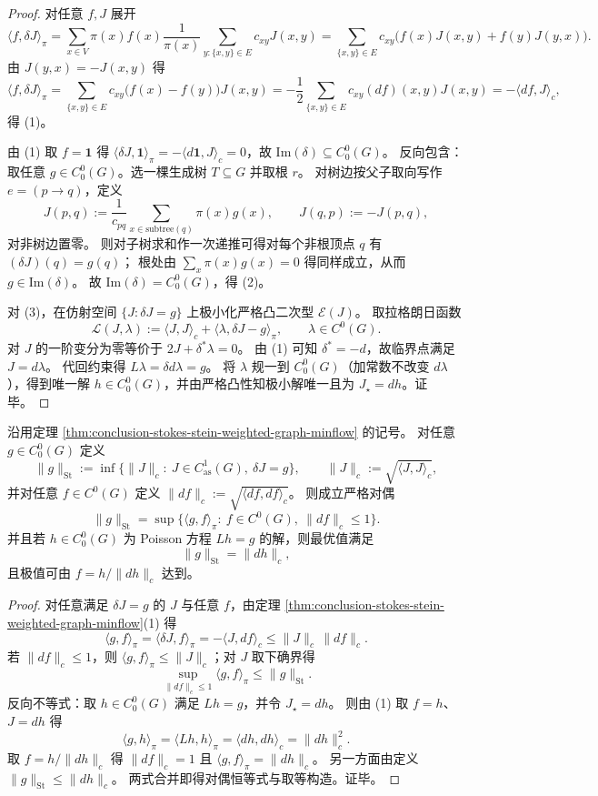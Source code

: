 \begin{proof}
对任意 \(f,J\) 展开
\[
\langle f,\delta J\rangle_\pi
=\sum_{x\in V}\pi(x)f(x)\frac{1}{\pi(x)}\sum_{y:\{x,y\}\in E}c_{xy}J(x,y)
=\sum_{\{x,y\}\in E}c_{xy}\bigl(f(x)J(x,y)+f(y)J(y,x)\bigr).
\]
由 \(J(y,x)=-J(x,y)\) 得
\[
\langle f,\delta J\rangle_\pi
=\sum_{\{x,y\}\in E}c_{xy}\bigl(f(x)-f(y)\bigr)J(x,y)
=-\frac12\sum_{\{x,y\}\in E}c_{xy}(df)(x,y)J(x,y)
=-\langle df,J\rangle_c,
\]
得 (1)。
\par
由 (1) 取 \(f=\mathbf 1\) 得 \(\langle \delta J,\mathbf 1\rangle_\pi=-\langle d\mathbf 1,J\rangle_c=0\)，故 \(\mathrm{Im}(\delta)\subseteq C^0_0(G)\)。
反向包含：取任意 \(g\in C^0_0(G)\)。选一棵生成树 \(T\subseteq G\) 并取根 \(r\)。
对树边按父子取向写作 \(e=(p\to q)\)，定义
\[
J(p,q):=\frac{1}{c_{pq}}\sum_{x\in \mathrm{subtree}(q)}\pi(x)g(x),
\qquad
J(q,p):=-J(p,q),
\]
对非树边置零。
则对子树求和作一次递推可得对每个非根顶点 \(q\) 有 \((\delta J)(q)=g(q)\)；
根处由 \(\sum_x\pi(x)g(x)=0\) 得同样成立，从而 \(g\in\mathrm{Im}(\delta)\)。
故 \(\mathrm{Im}(\delta)=C^0_0(G)\)，得 (2)。
\par
对 (3)，在仿射空间 \(\{J:\delta J=g\}\) 上极小化严格凸二次型 \(\mathcal E(J)\)。
取拉格朗日函数
\[
\mathcal L(J,\lambda):=\langle J,J\rangle_c+\langle \lambda,\delta J-g\rangle_\pi,
\qquad \lambda\in C^0(G).
\]
对 \(J\) 的一阶变分为零等价于
\(
2J+\delta^\ast\lambda=0
\)。
由 (1) 可知 \(\delta^\ast=-d\)，故临界点满足 \(J=d\lambda\)。
代回约束得 \(L\lambda=\delta d\lambda=g\)。
将 \(\lambda\) 规一到 \(C^0_0(G)\)（加常数不改变 \(d\lambda\)），得到唯一解 \(h\in C^0_0(G)\)，并由严格凸性知极小解唯一且为 \(J_\star=dh\)。证毕。
\end{proof}

\begin{corollary}\label{cor:conclusion-stokes-stein-dual-norm}
沿用定理 \ref{thm:conclusion-stokes-stein-weighted-graph-minflow} 的记号。
对任意 \(g\in C^0_0(G)\) 定义
\[
\|g\|_{\mathrm{St}}:=\inf\{\|J\|_c:\ J\in C^1_{\mathrm{as}}(G),\ \delta J=g\},
\qquad
\|J\|_c:=\sqrt{\langle J,J\rangle_c},
\]
并对任意 \(f\in C^0(G)\) 定义 \(\|df\|_c:=\sqrt{\langle df,df\rangle_c}\)。
则成立严格对偶
\[
\|g\|_{\mathrm{St}}
=\sup\{\langle g,f\rangle_\pi:\ f\in C^0(G),\ \|df\|_c\le 1\}.
\]
并且若 \(h\in C^0_0(G)\) 为 Poisson 方程 \(Lh=g\) 的解，则最优值满足
\[
\|g\|_{\mathrm{St}}=\|dh\|_c,
\]
且极值可由 \(f=h/\|dh\|_c\) 达到。
\end{corollary}
\begin{proof}
对任意满足 \(\delta J=g\) 的 \(J\) 与任意 \(f\)，由定理 \ref{thm:conclusion-stokes-stein-weighted-graph-minflow}(1) 得
\[
\langle g,f\rangle_\pi=\langle \delta J,f\rangle_\pi=-\langle J,df\rangle_c
\le \|J\|_c\,\|df\|_c.
\]
若 \(\|df\|_c\le 1\)，则 \(\langle g,f\rangle_\pi\le \|J\|_c\)；对 \(J\) 取下确界得
\[
\sup_{\|df\|_c\le 1}\langle g,f\rangle_\pi\le \|g\|_{\mathrm{St}}.
\]
反向不等式：取 \(h\in C^0_0(G)\) 满足 \(Lh=g\)，并令 \(J_\star=dh\)。
则由 (1) 取 \(f=h\)、\(J=dh\) 得
\[
\langle g,h\rangle_\pi=\langle Lh,h\rangle_\pi=\langle dh,dh\rangle_c=\|dh\|_c^2.
\]
取 \(f=h/\|dh\|_c\) 得 \(\|df\|_c=1\) 且
\(
\langle g,f\rangle_\pi=\|dh\|_c
\)。
另一方面由定义 \(\|g\|_{\mathrm{St}}\le \|dh\|_c\)。
两式合并即得对偶恒等式与取等构造。证毕。
\end{proof}

